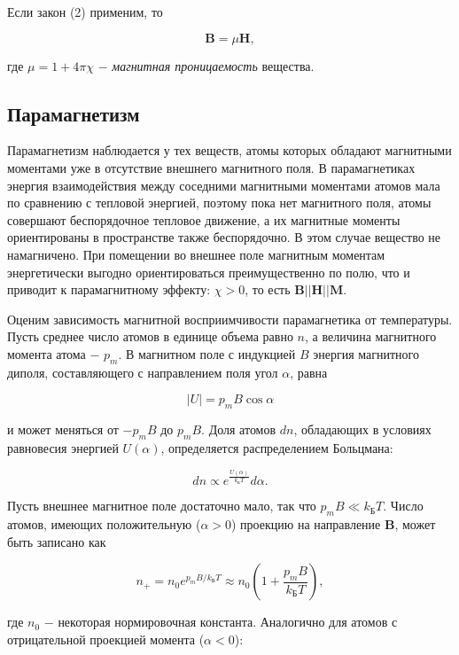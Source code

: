 \documentclass[a4paper,12pt]{article} %
\begin{document}
\hfill \break Если закон (2) применим, то

\begin{equation}\label{ linkname }
\textbf{B} = \mu \textbf{H},
\end{equation}

\hfill \break где $\mu = 1 + 4\pi\chi$ $-$ \textit{магнитная проницаемость} вещества.

\subsection{Парамагнетизм}
\hfill \break Парамагнетизм наблюдается у тех веществ, атомы которых обладают магнитными моментами уже в отсутствие внешнего магнитного поля. В парамагнетиках энергия взаимодействия между соседними магнитными моментами атомов мала по сравнению с тепловой энергией, поэтому пока нет магнитного поля, атомы совершают беспорядочное тепловое движение, а их магнитные моменты ориентированы в пространстве также беспорядочно. В этом случае вещество не намагничено. При помещении во внешнее поле магнитным моментам энергетически выгодно ориентироваться преимущественно по полю, что и приводит к парамагнитному эффекту: $\chi > 0$, то есть $\textbf{B} || \textbf{H} || \textbf{M}$. 

\hfill \break Оценим зависимость магнитной восприимчивости парамагнетика от температуры. Пусть среднее число атомов в единице объема равно $n$, а величина магнитного момента атома $-$ $p_{m}$. В магнитном поле с индукцией $B$ энергия магнитного диполя, составляющего с направлением поля угол $\alpha$, равна

$$
|U| = p_{m}B\cos{\alpha}
$$

\hfill \break и может меняться от $-p_{m}B$ до $p_{m}B$. Доля атомов $dn$, обладающих в условиях равновесия энергией $U(\alpha)$, определяется распределением Больцмана:

$$
dn \propto e^{\frac{U(\alpha)}{k_\text{Б}T}}d\alpha.
$$

\hfill \break Пусть внешнее магнитное поле достаточно мало, так что $p_{m}B \ll k_\text{Б}T$. Число атомов, имеющих положительную ($\alpha > 0$) проекцию на направление $\textbf{B}$, может быть записано как

$$
n_{+} = n_{0}e^{p_{m}B/k_\text{Б}T} \approx n_{0} \left( 1 + \frac{p_{m}B}{k_\text{Б}T} \right),
$$

\hfill \break где $n_{0}$ $-$ некоторая нормировочная константа. Аналогично для атомов с отрицательной проекцией момента ($\alpha < 0$):
\end{document}
